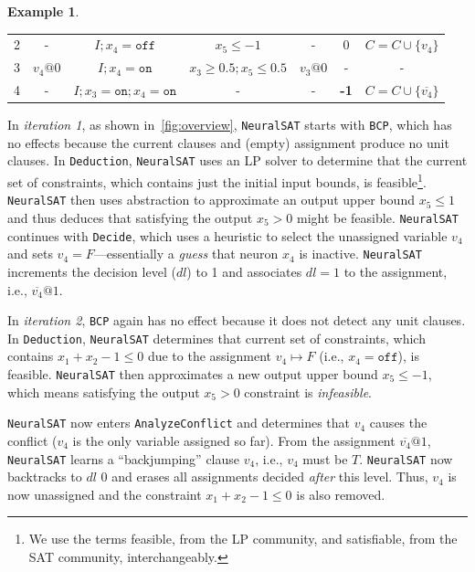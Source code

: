 \documentclass[oneside,11pt,dvipsnames]{book}
\numberwithin{equation}{section}
\theoremstyle{definition}
\newtheorem{example}{Example}[section]
\theoremstyle{remark}
\newcommand{\neuralsat}{\texttt{NeuralSAT}}
\begin{document}
\begin{example}
\begin{table}
\begin{tabular}{ccccccc}
        2 &-&$I; x_4=\texttt{off}$&$ x_5 \le -1$& - & 0 &  $C = C \cup \{v_4\}$\\
        
        3 &$v_4@0$&$I; x_4=\texttt{on} $&$ x_3 \ge 0.5; x_5 \le 0.5$ & $v_3@0$&-&-\\
        
        4 &-&$I; x_3=\texttt{on}; x_4=\texttt{on}$&-&- & \bf{-1} & $C = C\cup \{\overline{v_4}\}$\\
        
        
         \bottomrule
      \end{tabular}
  \end{table}

  

In \emph{iteration 1}, as shown in~\autoref{fig:overview}, \neuralsat{} starts with \texttt{BCP}, which has no effects because the current clauses and (empty) assignment produce no unit clauses.
In \texttt{Deduction}, \neuralsat{} uses an LP solver to determine that the current set of constraints, which contains just the initial input bounds, is feasible\footnote{We use the terms feasible, from the LP community, and satisfiable, from the SAT community, interchangeably.}. \neuralsat{} then uses abstraction to approximate an output upper bound $x_5 \le 1$ and thus deduces that satisfying the output $x_5 >0$ might be feasible. \neuralsat{} continues with \texttt{Decide}, which uses a heuristic to select the unassigned variable $v_4$ and sets $v_4=F$---essentially a \emph{guess} that neuron $x_4$ is inactive. \neuralsat{} increments the decision level ($dl$) to 1 and associates $dl=1$ to the assignment, i.e., $\overline{v_4}@1$.


In \emph{iteration 2}, \texttt{BCP} again has no effect because it does not detect any unit clauses. In \texttt{Deduction}, \neuralsat{} determines that current set of constraints, which contains $x_1 + x_2 - 1 \le 0$ due to the assignment $v_4\mapsto F$ (i.e., $x_4=\texttt{off}$), is feasible. \neuralsat{} then approximates a new output upper bound $x_5\le -1$, which means satisfying the output $x_5 > 0$ constraint is \emph{infeasible}.

\neuralsat{} now enters \texttt{AnalyzeConflict} and determines that $v_4$ causes the conflict ($v_4$ is the only variable assigned so far).  From the assignment $\overline{v_4}@1$, \neuralsat{} learns a ``backjumping'' clause $v_4$, i.e., $v_4$ must be $T$. \neuralsat{} now backtracks to $dl$ $0$ and erases all assignments decided \emph{after} this level. Thus, $v_4$ is now unassigned and the constraint  $x_1 + x_2 - 1 \le 0$ is also removed.


\end{example}
\end{document}
